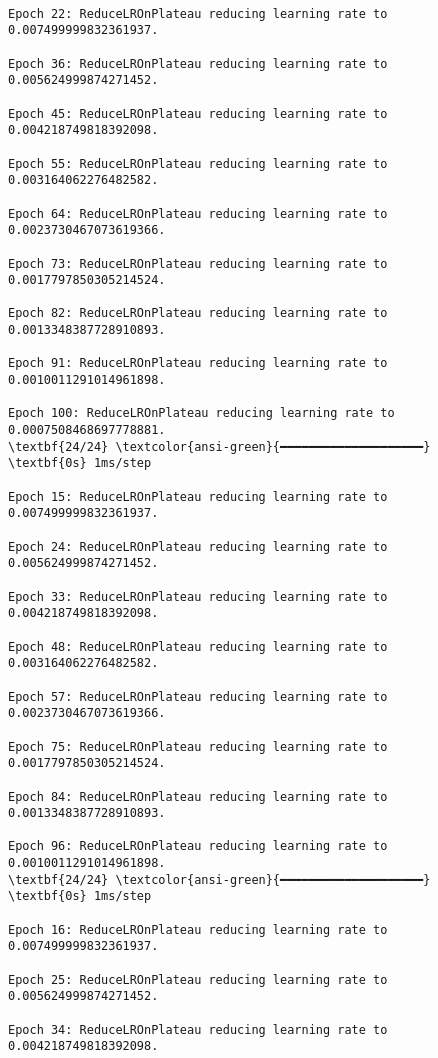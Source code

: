 \documentclass[11pt]{article}
\begin{document}
    \begin{Verbatim}[commandchars=\\\{\}]

Epoch 22: ReduceLROnPlateau reducing learning rate to 0.007499999832361937.

Epoch 36: ReduceLROnPlateau reducing learning rate to 0.005624999874271452.

Epoch 45: ReduceLROnPlateau reducing learning rate to 0.004218749818392098.

Epoch 55: ReduceLROnPlateau reducing learning rate to 0.003164062276482582.

Epoch 64: ReduceLROnPlateau reducing learning rate to 0.0023730467073619366.

Epoch 73: ReduceLROnPlateau reducing learning rate to 0.0017797850305214524.

Epoch 82: ReduceLROnPlateau reducing learning rate to 0.0013348387728910893.

Epoch 91: ReduceLROnPlateau reducing learning rate to 0.0010011291014961898.

Epoch 100: ReduceLROnPlateau reducing learning rate to 0.0007508468697778881.
\textbf{24/24} \textcolor{ansi-green}{━━━━━━━━━━━━━━━━━━━━} \textbf{0s} 1ms/step

Epoch 15: ReduceLROnPlateau reducing learning rate to 0.007499999832361937.

Epoch 24: ReduceLROnPlateau reducing learning rate to 0.005624999874271452.

Epoch 33: ReduceLROnPlateau reducing learning rate to 0.004218749818392098.

Epoch 48: ReduceLROnPlateau reducing learning rate to 0.003164062276482582.

Epoch 57: ReduceLROnPlateau reducing learning rate to 0.0023730467073619366.

Epoch 75: ReduceLROnPlateau reducing learning rate to 0.0017797850305214524.

Epoch 84: ReduceLROnPlateau reducing learning rate to 0.0013348387728910893.

Epoch 96: ReduceLROnPlateau reducing learning rate to 0.0010011291014961898.
\textbf{24/24} \textcolor{ansi-green}{━━━━━━━━━━━━━━━━━━━━} \textbf{0s} 1ms/step

Epoch 16: ReduceLROnPlateau reducing learning rate to 0.007499999832361937.

Epoch 25: ReduceLROnPlateau reducing learning rate to 0.005624999874271452.

Epoch 34: ReduceLROnPlateau reducing learning rate to 0.004218749818392098.


\end{Verbatim}
\end{document}
